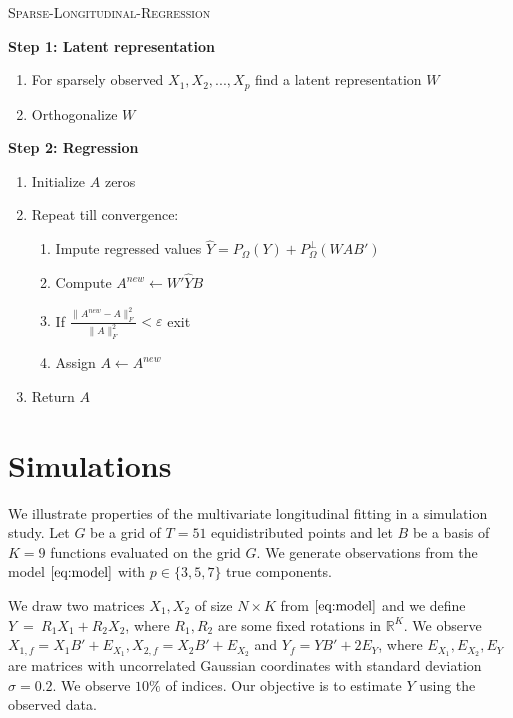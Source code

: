 \documentclass[preprint]{imsart}
\numberwithin{equation}{section}
\theoremstyle{plain}
\newcommand{\R}{\mathbb{R}}
\DeclareMathOperator*{\diag}{diag}
\begin{document}
\begin{algorithm}
\caption{\textsc{Sparse-Longitudinal-Regression}\label{alg:sparse-regression}}
\vspace{3pt}
\begin{flushleft}
\textbf{Step 1: Latent representation}
\end{flushleft}
\begin{enumerate}
\item For sparsely observed $X_1,X_2,...,X_p$ find a latent representation $W$
\item Orthogonalize $W$
\end{enumerate}
\begin{flushleft}
\textbf{Step 2: Regression}
\end{flushleft}
\begin{enumerate}
\item Initialize $A$ zeros
\item Repeat till convergence:
\begin{enumerate}
\item Impute regressed values $\hat{Y} = P_\Omega(Y) + P_\Omega^\perp(WAB')$
\item Compute $A^{new} \leftarrow W'\hat{Y}B$
\item If $\frac{\|A^{new} - A\|_F^2}{\|A\|_F^2} < \varepsilon$ exit
\item Assign $A \leftarrow A^{new}$
\end{enumerate}
\item Return $A$
\end{enumerate}
\end{algorithm}


\section{Simulations}\label{s:simulation}

We illustrate properties of the multivariate longitudinal fitting in a simulation study. Let $G$ be a grid of $T = 51$ equidistributed points and let $B$ be a basis of $K = 9$ functions evaluated on the grid $G$. We generate observations from the model $\eqref{eq:model}$ with $p \in \{3,5,7\}$ true components. %

We draw two matrices $X_1,X_2$ of size $N \times K$ from $\eqref{eq:model}$ and we define $Y~=~R_1 X_1 + R_2 X_2$, where $R_1,R_2$ are some fixed rotations in $\R^K$. We observe $X_{1,f} = X_1B' + E_{X_1}, X_{2,f} = X_2 B' + E_{X_2}$ and $Y_f = YB' + 2E_Y$, where $E_{X_1},E_{X_2},E_{Y}$ are matrices with uncorrelated Gaussian coordinates with standard deviation $\sigma = 0.2$. We observe $10\%$ of indices. Our objective is to estimate $Y$ using the observed data.
\end{document}
